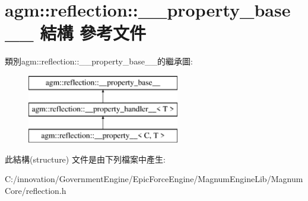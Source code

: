 \hypertarget{structagm_1_1reflection_1_1____property__base____}{}\section{agm\+:\+:reflection\+:\+:\+\_\+\+\_\+property\+\_\+base\+\_\+\+\_\+ 結構 參考文件}
\label{structagm_1_1reflection_1_1____property__base____}
類別agm\+:\+:reflection\+:\+:\+\_\+\+\_\+property\+\_\+base\+\_\+\+\_\+的繼承圖\+:\begin{figure}[H]
\begin{center}
\leavevmode
\includegraphics[height=3.000000cm]{structagm_1_1reflection_1_1____property__base____}
\end{center}
\end{figure}


此結構(structure) 文件是由下列檔案中產生\+:\begin{DoxyCompactItemize}
\item 
C\+:/innovation/\+Government\+Engine/\+Epic\+Force\+Engine/\+Magnum\+Engine\+Lib/\+Magnum\+Core/reflection.\+h\end{DoxyCompactItemize}
